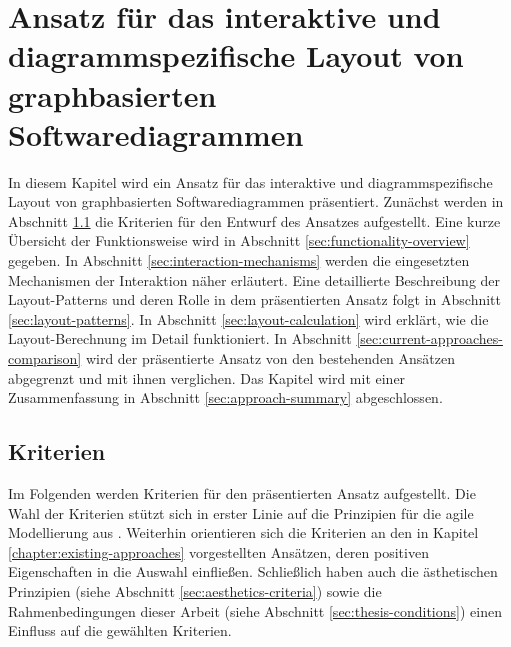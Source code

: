 
\chapter{Ansatz für das interaktive und diagrammspezifische Layout von graphbasierten Softwarediagrammen}
\label{chapter:interactive-approach}

In diesem Kapitel wird ein Ansatz für das interaktive und diagrammspezifische Layout von graphbasierten Softwarediagrammen präsentiert. Zunächst werden in Abschnitt \ref{sec:criteria} die Kriterien für den Entwurf des Ansatzes aufgestellt. Eine kurze Übersicht der Funktionsweise wird in Abschnitt \ref{sec:functionality-overview} gegeben. In Abschnitt \ref{sec:interaction-mechanisms} werden die eingesetzten Mechanismen der Interaktion näher erläutert. Eine detaillierte Beschreibung der Layout-Patterns und deren Rolle in dem präsentierten Ansatz folgt in Abschnitt \ref{sec:layout-patterns}. In Abschnitt \ref{sec:layout-calculation} wird erklärt, wie die Layout-Berechnung im Detail funktioniert. In Abschnitt \ref{sec:current-approaches-comparison} wird der präsentierte Ansatz von den bestehenden Ansätzen abgegrenzt und mit ihnen verglichen. Das Kapitel wird mit einer Zusammenfassung in Abschnitt \ref{sec:approach-summary} abgeschlossen.

\section{Kriterien}
\label{sec:criteria}

Im Folgenden werden Kriterien für den präsentierten Ansatz aufgestellt. Die Wahl der Kriterien stützt sich in erster Linie auf die Prinzipien für die agile Modellierung aus \cite{Ambler02Agile}. Weiterhin orientieren sich die Kriterien an den in Kapitel \ref{chapter:existing-approaches} vorgestellten Ansätzen, deren positiven Eigenschaften in die Auswahl einfließen.   Schließlich haben auch die ästhetischen Prinzipien (siehe Abschnitt \ref{sec:aesthetics-criteria}) sowie die Rahmenbedingungen dieser Arbeit (siehe Abschnitt \ref{sec:thesis-conditions}) einen Einfluss auf die gewählten Kriterien.

